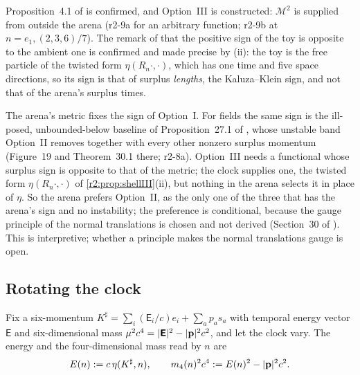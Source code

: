 Proposition~4.1 of \cite{FMB} is confirmed, and Option~III is constructed: $\mathcal M^2$ is supplied from outside the arena (r2-9a for an arbitrary
function; r2-9b at $n=e_1,(2,3,6)/7$). The remark of \cite{FMB} that the positive sign of the toy is opposite to the ambient one is confirmed and made
precise by (ii): the toy is the free particle of the twisted form $\eta(R_n\cdot,\cdot)$, which has one time and five space directions, so its sign is
that of surplus \emph{lengths}, the Kaluza--Klein sign, and not that of the arena's surplus times.

\begin{remark}
\label{r2:rem:prefer}
The arena's metric fixes the sign of Option~I. For fields the same sign is the ill-posed, unbounded-below baseline of Proposition~27.1 of \cite{ES17}, whose
unstable band Option~II removes together with every other nonzero surplus momentum (Figure~19 and Theorem~30.1 there; r2-8a). Option~III needs a
functional whose surplus sign is opposite to that of the metric; the clock supplies one, the twisted form $\eta(R_n\cdot,\cdot)$ of
\cref{r2:prop:shellIII}(ii), but nothing in the arena selects it in place of $\eta$. So the arena prefers Option~II, as the only one of the three that has the arena's sign and no
instability; the preference is conditional, because the gauge principle of the normal translations is chosen and not derived (Section~30 of
\cite{ES17}). This is interpretive; whether a principle makes the normal translations gauge is open.
\end{remark}

\subsection{Rotating the clock}
\label{r2:sec:rotate}

Fix a six-momentum $K^\sharp=\sum_i(\mathsf E_i/c)e_i+\sum_ap_as_a$ with temporal energy vector $\boldsymbol{\mathsf E}$ and six-dimensional mass
$\mu^2c^4=|\boldsymbol{\mathsf E}|^2-|\mathbf p|^2c^2$, and let the clock vary. The energy and the four-dimensional mass read by $n$ are
\[
E(n):=c\,\eta(K^\sharp,n),\qquad m_4(n)^2c^4:=E(n)^2-|\mathbf p|^2c^2 .
\]

